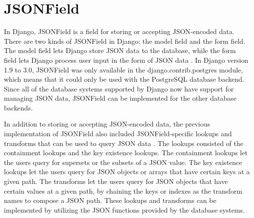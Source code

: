 \section{JSONField}

In Django, JSONField is a field for storing or accepting JSON-encoded data.
There are two kinds of JSONField in Django: the model field and the form field.
The model field lets Django store JSON data to the database, while the form
field lets Django process user input in the form of JSON data
\cite{django30_modeljsonfield} \cite{django30_formjsonfield}. In Django version
1.9 to 3.0, JSONField was only available in the django.contrib.postgres module,
which means that it could only be used with the PostgreSQL database backend.
Since all of the database systems supported by Django now have support for
managing JSON data, JSONField can be implemented for the other database
backends.

In addition to storing or accepting JSON-encoded data, the previous
implementation of JSONField also included JSONField-specific lookups and
transforms that can be used to query JSON data \cite{django30_modeljsonfield}.
The lookups consisted of the containment lookups and the key existence lookups.
The containment lookups let the users query for supersets or the subsets of a
JSON value. The key existence lookups let the users query for JSON objects or
arrays that have certain keys at a given path. The transforms let the users
query for JSON objects that have certain values at a given path, by chaining
the keys or indexes as the transform names to compose a JSON path. These
lookups and transforms can be implemented by utilizing the JSON functions
provided by the database systems.
